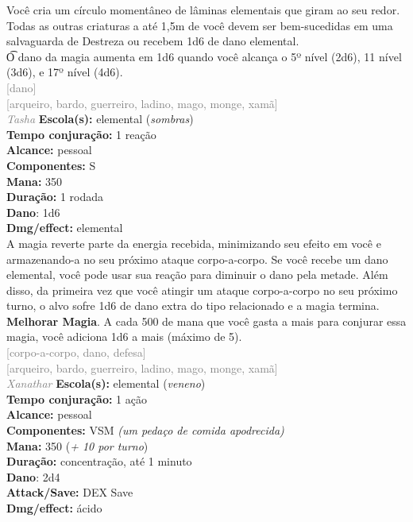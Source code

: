 \documentclass{RPG_Adventure}[2021/10/20]
\begin{document}
{\normalsize Você cria um círculo momentâneo de lâminas elementais que giram ao seu redor. Todas as outras criaturas a até 1,5m de você devem ser bem-sucedidas em uma salvaguarda de Destreza ou recebem 1d6 de dano elemental.\\\t O dano da magia aumenta em 1d6 quando você alcança o 5º nível (2d6), 11 nível (3d6), e 17º nível (4d6).\\}
{\scriptsize \textcolor{gray}{[dano]\\}}
{\scriptsize \textcolor{gray}{[arqueiro, bardo, guerreiro, ladino, mago, monge, xamã]\\}}
{\tiny \textcolor{gray}{\textit{Tasha}}}\jump{}
{\small \t \textbf{Escola(s):} elemental (\textit{sombras})\\\t \textbf{Tempo conjuração:} 1 reação\\\t \textbf{Alcance:} pessoal\\\t \textbf{Componentes:} S\\\t \textbf{Mana:} 350\\\t \textbf{Duração:} 1 rodada\\\t \textbf{Dano}: 1d6\\\t \textbf{Dmg/effect:} elemental\\}
{\normalsize A magia reverte parte da energia recebida, minimizando seu efeito em você e armazenando-a no seu próximo ataque corpo-a-corpo. Se você recebe um dano elemental, você pode usar sua reação para diminuir o dano pela metade. Além disso, da primeira vez que você atingir um ataque corpo-a-corpo no seu próximo turno, o alvo sofre 1d6 de dano extra do tipo relacionado e a magia termina.\\\t \textbf{Melhorar Magia}. A cada 500 de mana que você gasta a mais para conjurar essa magia, você adiciona 1d6 a mais (máximo de 5).\\}
{\scriptsize \textcolor{gray}{[corpo-a-corpo, dano, defesa]\\}}
{\scriptsize \textcolor{gray}{[arqueiro, bardo, guerreiro, ladino, mago, monge, xamã]\\}}
{\tiny \textcolor{gray}{\textit{Xanathar}}}\jump{}
{\small \t \textbf{Escola(s):} elemental (\textit{veneno})\\\t \textbf{Tempo conjuração:} 1 ação\\\t \textbf{Alcance:} pessoal\\\t \textbf{Componentes:} VSM \textit{(um pedaço de comida apodrecida)}\\\t \textbf{Mana:} 350 (\textit{+ 10 por turno})\\\t \textbf{Duração:} concentração, até 1 minuto\\\t \textbf{Dano}: 2d4\\\t \textbf{Attack/Save:} DEX Save\\\t \textbf{Dmg/effect:} ácido\\}
\end{document}
